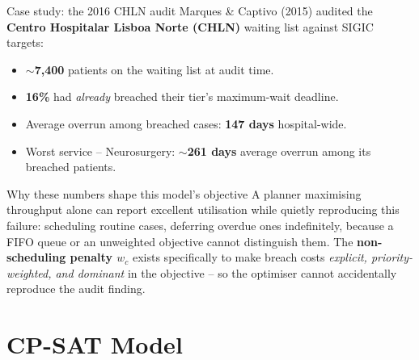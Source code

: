 \documentclass[10pt,aspectratio=169]{beamer}
\begin{document}
\begin{frame}{Case study: the 2016 CHLN audit}
  Marques \& Captivo (2015) audited the \textbf{Centro Hospitalar Lisboa
  Norte (CHLN)} waiting list against SIGIC targets:
  \begin{itemize}\small
    \item $\sim$\textbf{7{,}400} patients on the waiting list at audit time.
    \item \textbf{16\%} had \emph{already} breached their tier's maximum-wait
      deadline.
    \item Average overrun among breached cases: \textbf{147 days}
      hospital-wide.
    \item Worst service -- Neurosurgery: $\sim$\textbf{261 days} average
      overrun among its breached patients.
  \end{itemize}
  \pause
  \begin{block}{Why these numbers shape this model's objective}
    A planner maximising throughput alone can report excellent utilisation
    while quietly reproducing this failure: scheduling routine cases,
    deferring overdue ones indefinitely, because a FIFO queue or an
    unweighted objective cannot distinguish them.
    The \textbf{non-scheduling penalty $w_c$} exists specifically to make
    breach costs \emph{explicit, priority-weighted, and dominant} in the
    objective -- so the optimiser cannot accidentally reproduce the audit
    finding.
  \end{block}
\end{frame}

\section{CP-SAT Model}
\end{document}
